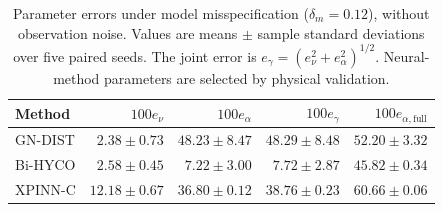 \begin{table}[t]
\centering
\small
\setlength{\tabcolsep}{5pt}
\begin{tabular}{lrrrr}
\toprule
Method & $100e_\nu$ & $100e_\alpha$ & $100e_\gamma$ & $100e_{\alpha,\mathrm{full}}$ \\
\midrule
GN-DIST & $2.38 \pm 0.73$ & $48.23 \pm 8.47$ & $48.29 \pm 8.48$ & $52.20 \pm 3.32$ \\
Bi-HYCO & $2.58 \pm 0.45$ & $7.22 \pm 3.00$ & $7.72 \pm 2.87$ & $45.82 \pm 0.34$ \\
XPINN-C & $12.18 \pm 0.67$ & $36.80 \pm 0.12$ & $38.76 \pm 0.23$ & $60.66 \pm 0.06$ \\
\bottomrule
\end{tabular}
\caption{Parameter errors under model misspecification ($\delta_m=0.12$), without observation noise. Values are means $\pm$ sample standard deviations over five paired seeds. The joint error is $e_\gamma=(e_\nu^2+e_\alpha^2)^{1/2}$. Neural-method parameters are selected by physical validation.}
\label{tab:ac-five-seed-parameters}
\end{table}
